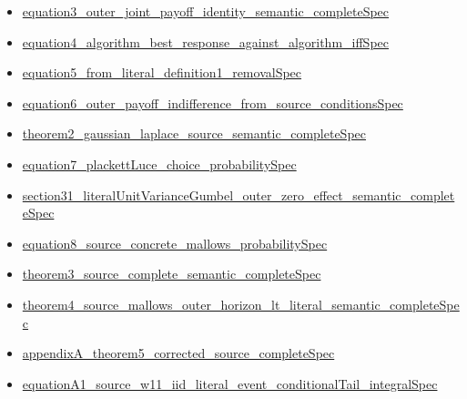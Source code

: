 \documentclass[10pt]{article}
\begin{document}
\begin{itemize}[leftmargin=1.2em]
\begin{itemize}[leftmargin=1.2em]
\item \hyperlink{source-claim-36b115610854f337}{equation3\_\allowbreak{}outer\_\allowbreak{}joint\_\allowbreak{}payoff\_\allowbreak{}identity\_\allowbreak{}semantic\_\allowbreak{}complete\allowbreak{}Spec}
\item \hyperlink{source-claim-ea5f4fa858fd5854}{equation4\_\allowbreak{}algorithm\_\allowbreak{}best\_\allowbreak{}response\_\allowbreak{}against\_\allowbreak{}algorithm\_\allowbreak{}iff\allowbreak{}Spec}
\item \hyperlink{source-claim-9d6309ccb42ce9df}{equation5\_\allowbreak{}from\_\allowbreak{}literal\_\allowbreak{}definition1\_\allowbreak{}removal\allowbreak{}Spec}
\item \hyperlink{source-claim-fa14b138c169a341}{equation6\_\allowbreak{}outer\_\allowbreak{}payoff\_\allowbreak{}indifference\_\allowbreak{}from\_\allowbreak{}source\_\allowbreak{}conditions\allowbreak{}Spec}
\item \hyperlink{source-claim-cc8111af16950cc8}{theorem2\_\allowbreak{}gaussian\_\allowbreak{}laplace\_\allowbreak{}source\_\allowbreak{}semantic\_\allowbreak{}complete\allowbreak{}Spec}
\item \hyperlink{source-claim-8940f397fa4678ac}{equation7\_\allowbreak{}plackett\allowbreak{}Luce\_\allowbreak{}choice\_\allowbreak{}probability\allowbreak{}Spec}
\item \hyperlink{source-claim-0156e1eedd228cc4}{section31\_\allowbreak{}literal\allowbreak{}Unit\allowbreak{}Variance\allowbreak{}Gumbel\_\allowbreak{}outer\_\allowbreak{}zero\_\allowbreak{}effect\_\allowbreak{}semantic\_\allowbreak{}complete\allowbreak{}Spec}
\item \hyperlink{source-claim-8dd2c310e7ffc8a6}{equation8\_\allowbreak{}source\_\allowbreak{}concrete\_\allowbreak{}mallows\_\allowbreak{}probability\allowbreak{}Spec}
\item \hyperlink{source-claim-fd702590ac30f669}{theorem3\_\allowbreak{}source\_\allowbreak{}complete\_\allowbreak{}semantic\_\allowbreak{}complete\allowbreak{}Spec}
\item \hyperlink{source-claim-e42fc5562761542b}{theorem4\_\allowbreak{}source\_\allowbreak{}mallows\_\allowbreak{}outer\_\allowbreak{}horizon\_\allowbreak{}lt\_\allowbreak{}literal\_\allowbreak{}semantic\_\allowbreak{}complete\allowbreak{}Spec}
\item \hyperlink{source-claim-54f72d882fb14d8c}{appendix\allowbreak{}A\_\allowbreak{}theorem5\_\allowbreak{}corrected\_\allowbreak{}source\_\allowbreak{}complete\allowbreak{}Spec}
\item \hyperlink{source-claim-9835a680c6142d09}{equation\allowbreak{}A1\_\allowbreak{}source\_\allowbreak{}w11\_\allowbreak{}iid\_\allowbreak{}literal\_\allowbreak{}event\_\allowbreak{}conditional\allowbreak{}Tail\_\allowbreak{}integral\allowbreak{}Spec}

\end{itemize}
\end{itemize}
\end{document}
